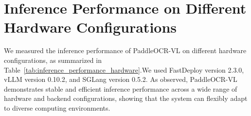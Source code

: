 \documentclass[11pt, a4paper,logo,  copyright, nonumbering]{paddleocr}
\begin{document}
\clearpage 
\newpage

\section{Inference Performance on Different Hardware Configurations}

We measured the inference performance of PaddleOCR-VL on different hardware configurations, as summarized in Table~\ref{tab:inference_performance_hardware}.We used FastDeploy version 2.3.0, vLLM version 0.10.2, and SGLang version 0.5.2. As observed, PaddleOCR-VL demonstrates stable and efficient inference performance across a wide range of hardware and backend configurations, showing that the system can flexibly adapt to diverse computing environments.

\begin{table}[H]
  \centering


\end{table}
\end{document}
